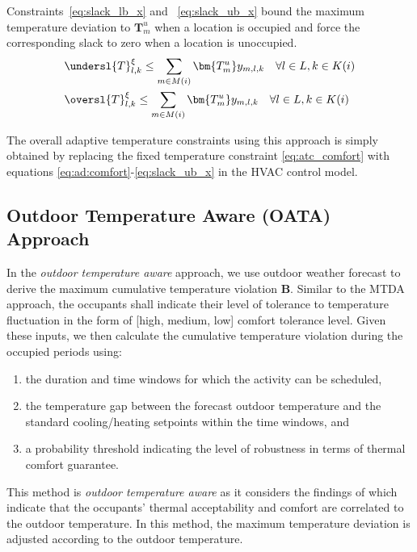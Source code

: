 Constraints~\eqref{eq:slack_lb_x} and ~\eqref{eq:slack_ub_x} bound the maximum temperature deviation to ${\bm T}^u_m$ when a location is occupied and force the corresponding slack to zero when a location is unoccupied. 
\begingroup
\begin{align}
&\undersl{T}^{\xi}_{l,k}  \leq \sum\limits_{m \in M(i)}\bm{T^u_m} y_{m,l,k} \quad  \forall l \in L, k \in K(i) \label{eq:slack_lb_x}  \\
&\oversl{T}^{\xi}_{l,k}   \leq \sum\limits_{m \in M(i)}\bm{T^u_m} y_{m,l,k} \quad  \forall l \in L, k \in K (i) \label{eq:slack_ub_x}
\end{align}

The overall adaptive temperature constraints using this approach is simply obtained by replacing the fixed temperature constraint \eqref{eq:atc_comfort} with equations \eqref{eq:ad:comfort}-\eqref{eq:slack_ub_x} in the HVAC control model.



\subsection{Outdoor Temperature Aware (OATA) Approach} \label{atc:oat}

In the \emph{\textsl{outdoor temperature aware}} approach, we use outdoor weather forecast to derive the maximum cumulative temperature violation ${\bm B}$. Similar to the MTDA approach, the occupants shall indicate their level of tolerance to temperature fluctuation in the form of [high, medium, low] comfort tolerance level. Given these inputs, we then calculate the cumulative temperature violation during the occupied periods using:
\begin{enumerate}
	\item the duration and time windows for which the activity can be scheduled, 
	\item the temperature gap between the forecast outdoor temperature and the standard cooling/heating setpoints within the time windows, and
	\item a probability threshold indicating the level of robustness in terms of thermal comfort guarantee.
\end{enumerate}
This method is \emph{\textsl{outdoor temperature aware}} as it considers the findings of \cite{de1998developing} which indicate that the occupants' thermal acceptability and comfort are correlated to the outdoor temperature. In this method, the maximum temperature deviation is adjusted according to the outdoor temperature. %

